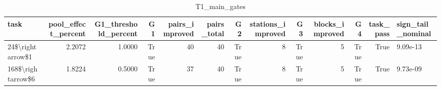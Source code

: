 \begin{table}
\caption{T1_main_gates}
\label{tab:T1_main_gates}
\begin{tabular}{lrrrrrrrrrrrl}
\toprule
task & pool\_effect\_percent & G1\_threshold\_percent & G1 & pairs\_improved & pairs\_total & G2 & stations\_improved & G3 & blocks\_improved & G4 & task\_pass & sign\_tail\_nominal \\
\midrule
24\$\textbackslash rightarrow\$1 & 2.2072 & 1.0000 & True & 40 & 40 & True & 8 & True & 5 & True & True & 9.09e-13 \\
168\$\textbackslash rightarrow\$6 & 1.8224 & 0.5000 & True & 37 & 40 & True & 8 & True & 5 & True & True & 9.73e-09 \\
\bottomrule
\end{tabular}
\end{table}
